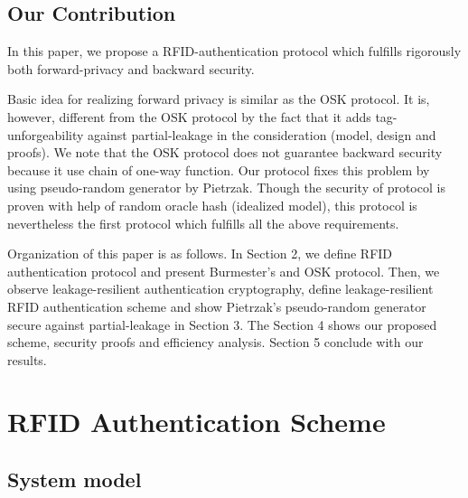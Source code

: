 \documentclass[english]{llncs}
\begin{document}
\subsection{Our Contribution}
In this paper, we propose a RFID-authentication protocol which
fulfills rigorously both forward-privacy and backward security.
%

Basic idea for realizing forward privacy is similar as 
the OSK protocol\cite{OSK03}.  
It is, however,
different from the OSK protocol by the fact that it adds
tag-unforgeability against partial-leakage in the consideration
(model, design and proofs). We note that the OSK protocol does not
guarantee backward security because it use chain of one-way
function. Our protocol fixes this problem by using pseudo-random
generator by Pietrzak\cite{P09}. Though the security of protocol is
proven with help of random oracle hash (idealized model), this
protocol is nevertheless the first protocol which fulfills all the above
requirements.

Organization of this paper is as follows. In Section 2, we define RFID
authentication protocol and present Burmester's and OSK
protocol. Then, we observe leakage-resilient authentication
cryptography, define leakage-resilient RFID authentication scheme and
show Pietrzak's pseudo-random generator secure against partial-leakage
in Section 3. The Section 4 shows our proposed scheme, security proofs
and efficiency analysis. Section 5 conclude with our results.

\section{RFID Authentication Scheme}


\subsection{System model}
\end{document}

